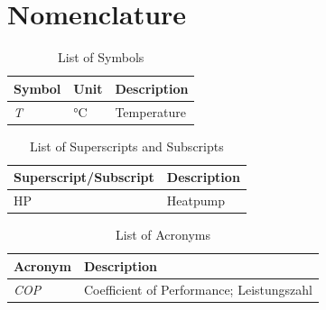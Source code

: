 \documentclass[12pt,a4paper]{report}
\begin{document}
\listoffigures

\chapter*{Nomenclature}
\begin{table}[h]
\centering
\caption{List of Symbols}
\begin{tabular}{l l l}
\toprule
\textbf{Symbol} & \textbf{Unit} & \textbf{Description} \\
\midrule
\textit{T} & \si{\celsius} & Temperature \\
\bottomrule
\end{tabular}
\end{table}

\begin{table}[h]
\centering
\caption{List of Superscripts and Subscripts}
\begin{tabular}{ll}
\toprule
\textbf{Superscript/Subscript} & \textbf{Description}\\
\midrule
HP & Heatpump\\
\bottomrule
\end{tabular}
\end{table}

\begin{table}[h]
\centering
\caption{List of Acronyms}
\begin{tabular}{ll}
\toprule
\textbf{Acronym} & \textbf{Description}\\
\midrule
\textit{COP} & Coefficient of Performance; Leistungszahl \\
\bottomrule
\end{tabular}
\end{table}

\printbibliography
{}
\setcounter{page}{10}

\end{document}
